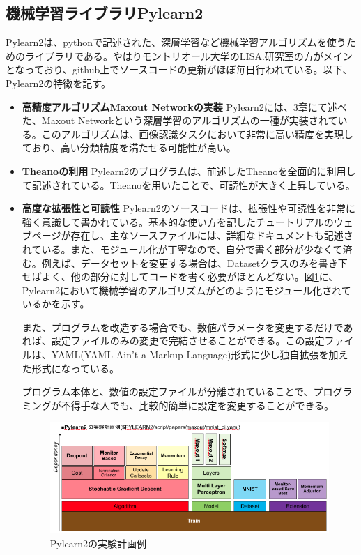 \subsection{機械学習ライブラリPylearn2}
Pylearn2は、pythonで記述された、深層学習など機械学習アルゴリズムを使うためのライブラリである\cite{goodfellow2013Pylearn2:}。やはりモントリオール大学のLISA.研究室の方がメインとなっており、github上でソースコードの更新がほぼ毎日行われている。以下、Pylearn2の特徴を記す。
\begin{itemize}
\item \textbf{高精度アルゴリズムMaxout Networkの実装}
Pylearn2には、3章にて述べた、Maxout Networkという深層学習のアルゴリズムの一種が実装されている。このアルゴリズムは、画像認識タスクにおいて非常に高い精度を実現しており、高い分類精度を満たせる可能性が高い。
\item \textbf{Theanoの利用}
Pylearn2のプログラムは、前述したTheanoを全面的に利用して記述されている。Theanoを用いたことで、可読性が大きく上昇している。
\item \textbf{高度な拡張性と可読性}
Pylearn2のソースコードは、拡張性や可読性を非常に強く意識して書かれている。基本的な使い方を記したチュートリアルのウェブページが存在し、主なソースファイルには、詳細なドキュメントも記述されている。また、モジュール化が丁寧なので、自分で書く部分が少なくて済む。例えば、データセットを変更する場合は、Datasetクラスのみを書き下せばよく、他の部分に対してコードを書く必要がほとんどない。図\ref{c4_Pylearn2_yaml}に、Pylearn2において機械学習のアルゴリズムがどのようにモジュール化されているかを示す。\par
また、プログラムを改造する場合でも、数値パラメータを変更するだけであれば、設定ファイルのみの変更で完結させることができる。この設定ファイルは、YAML(YAML Ain't a Markup Language)形式に少し独自拡張を加えた形式になっている。\par
プログラム本体と、数値の設定ファイルが分離されていることで、プログラミングが不得手な人でも、比較的簡単に設定を変更することができる。\par
\begin{figure}[tbp]
 \begin{center}
  \includegraphics[width=120mm]{img/c4/Pylearn2_yaml}
 \end{center}
 \caption{Pylearn2の実験計画例}
 \label{c4_Pylearn2_yaml}
\end{figure}
\end{itemize}

